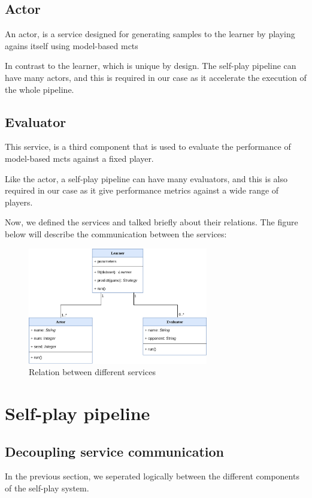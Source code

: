 \subsection{Actor}
An actor, is a service designed for generating samples to the learner by playing agains itself using model-based \acrshort{mcts}

In contrast to the learner, which is unique by design. The self-play pipeline can have many actors, and this is required in our case as it accelerate the execution of the whole pipeline.

\subsection{Evaluator}
This service, is a third component that is used to evaluate the performance of model-based \acrshort{mcts} against a fixed player.

Like the actor, a self-play pipeline can have many evaluators, and this is also required in our case as it give performance metrics against a wide range of players.

Now, we defined the services and talked briefly about their relations. The figure below will describe the communication between the services:
\begin{figure}[H]
	\centering
	\includegraphics[width=0.7\textwidth]{Figures/ServiceRelations.png}
	\caption{Relation between different services\label{fig:RelationServices}}
\end{figure}
\FloatBarrier


\section{Self-play pipeline}
\subsection{Decoupling service communication}
In the previous section, we seperated logically between the different components of the self-play system.

